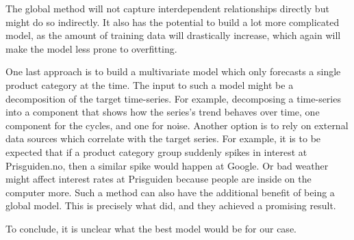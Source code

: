 The global method will not capture interdependent relationships directly
but might do so indirectly. It also has the potential to build a lot more complicated model,
as the amount of training data will drastically increase, which again will make the model less prone to
overfitting.

One last approach is to build a multivariate model which only forecasts a single product category at the time.
The input to such a model might be a decomposition of the target time-series.
For example, decomposing a time-series into a component that shows how the series's trend behaves over time,
one component for the cycles, and one for noise.
Another option is to rely on external data sources which correlate with the target series.
For example, it is to be expected that if a product category group suddenly spikes in interest at Prisguiden.no,
then a similar spike would happen at Google.
Or bad weather might affect interest rates at Prisguiden because people are inside on the computer more.
Such a method can also have the additional benefit of being a global model.
This is precisely what \cite{Laptev} did, and they achieved a promising result.

To conclude, it is unclear what the best model would be for our case.




